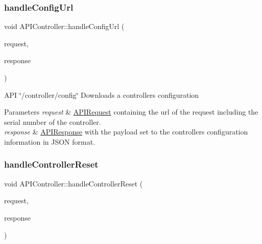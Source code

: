 \subsubsection{\texorpdfstring{handle\+Config\+Url}{handleConfigUrl}}
{\footnotesize\ttfamily void A\+P\+I\+Controller\+::handle\+Config\+Url (\begin{DoxyParamCaption}\item[{const \hyperlink{class_a_p_i_request}{A\+P\+I\+Request} \&}]{request,  }\item[{\hyperlink{class_a_p_i_response}{A\+P\+I\+Response} $\ast$}]{response }\end{DoxyParamCaption})\hspace{0.3cm}{\ttfamily [slot]}}

A\+PI \char`\"{}/controller/config\char`\"{} Downloads a controller\textquotesingle{}s configuration 
\begin{DoxyParams}{Parameters}
{\em request} & \hyperlink{class_a_p_i_request}{A\+P\+I\+Request} containing the url of the request including the serial number of the controller. \\
\hline
{\em response} & \hyperlink{class_a_p_i_response}{A\+P\+I\+Response} with the payload set to the controller\textquotesingle{}s configuration information in J\+S\+ON format. \\
\hline
\end{DoxyParams}
\mbox{\label{class_a_p_i_controller_a0e01eab749423dcfff0b595abf4175ad}} 
\subsubsection{\texorpdfstring{handle\+Controller\+Reset}{handleControllerReset}}
{\footnotesize\ttfamily void A\+P\+I\+Controller\+::handle\+Controller\+Reset (\begin{DoxyParamCaption}\item[{const \hyperlink{class_a_p_i_request}{A\+P\+I\+Request} \&}]{request,  }\item[{\hyperlink{class_a_p_i_response}{A\+P\+I\+Response} $\ast$}]{response }\end{DoxyParamCaption})\hspace{0.3cm}{\ttfamily [slot]}}

